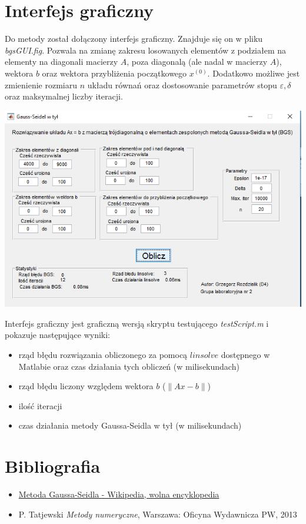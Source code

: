 \documentclass[12pt]{article}
\begin{document}
	\section{Interfejs graficzny}
	Do metody został dołączony interfejs graficzny. Znajduje się on w pliku \textit{bgsGUI.fig}. Pozwala na zmianę zakresu losowanych elementów z podziałem na elementy na diagonali macierzy $A$, poza diagonalą (ale nadal w macierzy $A$), wektora $b$ oraz wektora przybliżenia początkowego $x^{(0)}$. Dodatkowo możliwe jest zmienienie rozmiaru $n$ układu równań oraz dostosowanie parametrów stopu $\varepsilon, \delta$ oraz maksymalnej liczby iteracji.
	
	\includegraphics[scale=0.8]{gui-image}
	
	Interfejs graficzny jest graficzną wersją skryptu testującego \textit{testScript.m} i pokazuje następujące wyniki:
	\begin{itemize}
		\item rząd błędu rozwiązania obliczonego za pomocą $linsolve$ dostępnego w Matlabie oraz czas działania tych obliczeń (w milisekundach)
		\item rząd błędu liczony względem wektora $b$ ($\|Ax - b\|$)
		\item ilość iteracji
		\item czas działania metody Gaussa-Seidla w tył (w milisekundach)
	\end{itemize}

	\pagebreak

	\section{Bibliografia}
	\begin{itemize}
		\item \href{https://pl.wikipedia.org/wiki/Metoda_Gaussa-Seidla}{Metoda Gaussa-Seidla - Wikipedia, wolna encyklopedia}
		\item P. Tatjewski \textit{Metody numeryczne}, Warszawa: Oficyna Wydawnicza PW, 2013
	\end{itemize}
\end{document}
